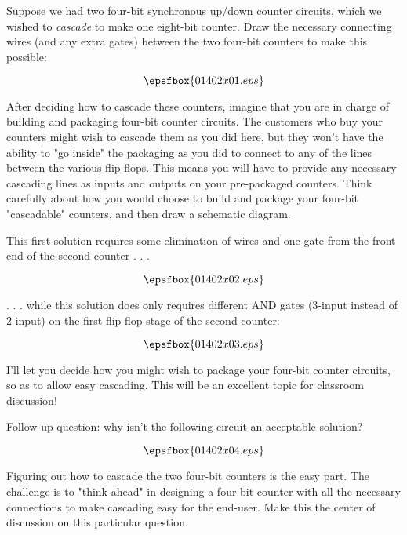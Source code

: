 

Suppose we had two four-bit synchronous up/down counter circuits, which we wished to {\it cascade} to make one eight-bit counter.  Draw the necessary connecting wires (and any extra gates) between the two four-bit counters to make this possible:

$$\epsfbox{01402x01.eps}$$

After deciding how to cascade these counters, imagine that you are in charge of building and packaging four-bit counter circuits.  The customers who buy your counters might wish to cascade them as you did here, but they won't have the ability to "go inside" the packaging as you did to connect to any of the lines between the various flip-flops.  This means you will have to provide any necessary cascading lines as inputs and outputs on your pre-packaged counters.  Think carefully about how you would choose to build and package your four-bit "cascadable" counters, and then draw a schematic diagram.







This first solution requires some elimination of wires and one gate from the front end of the second counter . . .

$$\epsfbox{01402x02.eps}$$

. . . while this solution does only requires different AND gates (3-input instead of 2-input) on the first flip-flop stage of the second counter:

$$\epsfbox{01402x03.eps}$$

\vskip 10pt

I'll let you decide how you might wish to package your four-bit counter circuits, so as to allow easy cascading.  This will be an excellent topic for classroom discussion!

\vskip 10pt

\goodbreak
Follow-up question: why isn't the following circuit an acceptable solution?

$$\epsfbox{01402x04.eps}$$







Figuring out how to cascade the two four-bit counters is the easy part.  The challenge is to "think ahead" in designing a four-bit counter with all the necessary connections to make cascading easy for the end-user.  Make this the center of discussion on this particular question.




